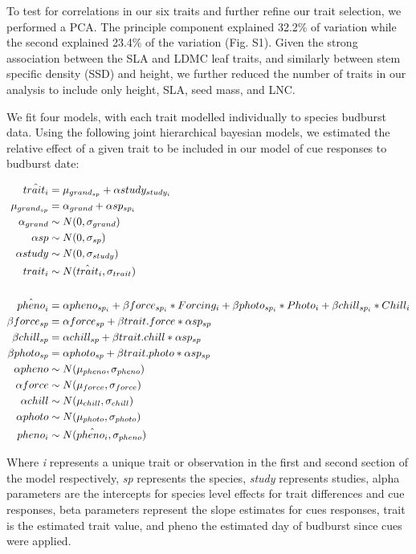 \documentclass{article}\usepackage[]{graphicx}\usepackage[]{color}
\begin{document}
To test for correlations in our six traits and further refine our trait selection, we performed a PCA. The principle component explained 32.2\% of variation while the second explained 23.4\% of the variation (Fig. S1). Given the strong association between the SLA and LDMC leaf traits, and similarly between stem specific density (SSD) and height, we further reduced the number of traits in our analysis to include only height, SLA, seed mass, and LNC. 

We fit four models, with each trait modelled individually to species budburst data.  Using the following joint hierarchical bayesian models, we estimated the relative effect of a given trait to be included in our model of cue responses to budburst date: 

\begin{align*}
\hat{trait_i} &= \mu_{grand_{sp}} + \alpha study_{study_i} \\
\mu_{grand_{sp}} &= \alpha_{grand} + \alpha sp_{sp_i} \\
\alpha_{grand}  & \sim N(0, \sigma_{grand})\\
\alpha sp & \sim N(0, \sigma_{sp}) \\
\alpha study& \sim N(0, \sigma_{study}) \\
trait_i & \sim N(\hat{trait}_i, \sigma_{trait}) \\
\vspace{1ex}\\
\hat{pheno}_i  &= \alpha pheno_{sp_i} + \beta force_{sp_i} * Forcing_{i} + \beta photo_{sp_i}  * Photo_{i} + \beta chill_{sp_i} * Chill_{i} \\
\beta force_{sp} &= \alpha force_{sp} + \beta trait.force * \alpha sp_{sp}\\
\beta chill_{sp} &= \alpha chill_{sp} + \beta trait.chill * \alpha sp_{sp}\\
\beta photo_{sp} &= \alpha photo_{sp} + \beta trait.photo * \alpha sp_{sp}\\
\alpha pheno & \sim N(\mu_{pheno}, \sigma_{pheno}) \\
\alpha force& \sim N(\mu_{force}, \sigma_{force}) \\
\alpha chill & \sim N(\mu_{chill}, \sigma_{chill}) \\
\alpha photo & \sim N(\mu_{photo}, \sigma_{photo}) \\
pheno_{i} & \sim N(\hat{pheno_i}, \sigma_{pheno}) \\
\end{align*}

Where \emph{i} represents a unique trait or observation in the first and second section of the model respectively, \emph{sp} represents the species, \emph{study} represents studies, alpha parameters are the intercepts for species level effects for trait differences and cue responses, beta parameters represent the slope estimates for cues responses, trait is the estimated trait value, and pheno the estimated day of budburst since cues were applied. %
\end{document}
